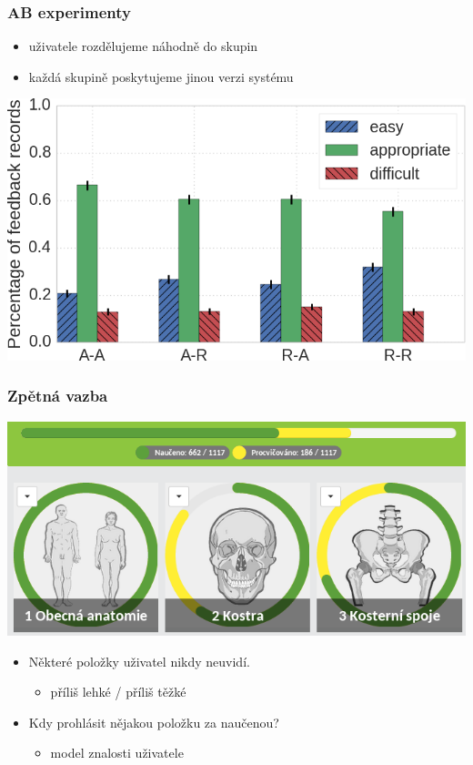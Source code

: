 \documentclass[xcolor=svgnames]{beamer}
\begin{document}
\begin{frame}
	\frametitle{AB experimenty}
	\begin{itemize}
		\item uživatele rozdělujeme náhodně do skupin
		\item každá skupině poskytujeme jinou verzi systému
	\end{itemize}
	\begin{center}
		\includegraphics[width=.8\textwidth]{img/feedback}
	\end{center}
\end{frame}
\begin{frame}
	\frametitle{Zpětná vazba}
	\begin{center}
		\includegraphics[width=.8\textwidth]{img/knowledge_feedback_overview}
	\end{center}
	\pause
	\begin{itemize}
		\item Některé položky uživatel nikdy neuvidí.
			\begin{itemize}
				\item příliš lehké / příliš těžké
			\end{itemize}
		\item Kdy prohlásit nějakou položku za naučenou?
			\begin{itemize}
				\item model znalosti uživatele
			\end{itemize}
	\end{itemize}
\end{frame}
\end{document}
